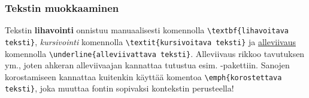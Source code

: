 \begin{fframe}
    \frametitle{Tekstin muokkaaminen}
    \pause
    Tekstin \textbf{lihavointi} onnistuu manuaalisesti komennolla \lstinline-\textbf{lihavoitava teksti}-, \textit{kursivointi} komennolla \lstinline-\textit{kursivoitava teksti}- ja \underline{alleviivaus} komennolla \lstinline-\underline{alleviivattava teksti}-. Alleviivaus rikkoo tavutuksen ym., joten ahkeran alleviivaajan kannattaa tutustua esim. -pakettiin.
    \vaihto\pause
    Sanojen korostamiseen kannattaa kuitenkin käyttää komentoa \verb-\emph{korostettava teksti}-, joka muuttaa fontin sopivaksi kontekstin perusteella!
\end{fframe}

%
%

